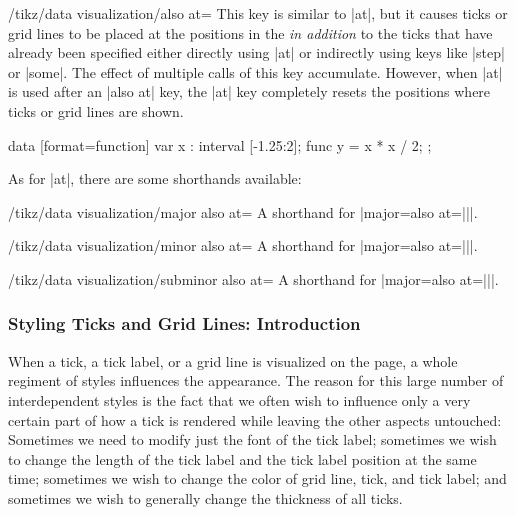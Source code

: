 \begin{key}{/tikz/data visualization/also at=}
    This key is similar to |at|, but it causes ticks or grid lines to be placed
    at the positions in the  \emph{in addition} to the ticks that
    have already been specified either directly using |at| or indirectly using
    keys like |step| or |some|. The effect of multiple calls of this key
    accumulate. However, when |at| is used after an |also at| key, the |at| key
    completely resets the positions where ticks or grid lines are shown.
\begin{codeexample}[preamble={\usetikzlibrary{datavisualization.formats.functions}}]
\tikz \datavisualization
  [ school book axes, visualize as smooth line,
    x axis={grid, ticks and grid={major={also at={0.5}}}}]
  data [format=function] {
    var x : interval [-1.25:2];
    func y = \value x * \value x / 2;
  };
\end{codeexample}
    As for |at|, there are some shorthands available:
    \begin{key}{/tikz/data visualization/major also at=}
        A shorthand for |major={also at={||}}|.
    \end{key}
    \begin{key}{/tikz/data visualization/minor also at=}
        A shorthand for |major={also at={||}}|.
    \end{key}
    \begin{key}{/tikz/data visualization/subminor also at=}
        A shorthand for |major={also at={||}}|.
    \end{key}
\end{key}


\subsubsection{Styling Ticks and Grid Lines: Introduction}
\label{section-dv-ticks-styling}

When a tick, a tick label, or a grid line is visualized on the page, a whole
regiment of styles influences the appearance. The reason for this large number
of interdependent styles is the fact that we often wish to influence only a
very certain part of how a tick is rendered while leaving the other aspects
untouched: Sometimes we need to modify just the font of the tick label;
sometimes we wish to change the length of the tick label and the tick label
position at the same time; sometimes we wish to change the color of grid line,
tick, and tick label; and sometimes we wish to generally change the thickness
of all ticks.

